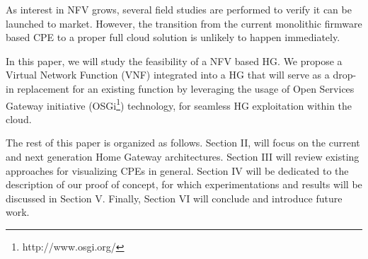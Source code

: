 As interest in NFV grows, several field studies are performed to verify it can be launched to market.
However, the transition from the current monolithic firmware based CPE to a proper full cloud solution is unlikely to happen immediately.

In this paper, we will study the feasibility of a NFV based HG. We propose a Virtual Network Function (VNF) integrated into a HG that will serve as a drop-in replacement for an existing function by leveraging the usage of Open Services Gateway initiative (OSGi\footnote{http://www.osgi.org/}) technology, for seamless HG exploitation within the cloud.

The rest of this paper is organized as follows.
Section II, will focus on the current and next generation Home Gateway architectures.
Section III will review existing approaches for visualizing CPEs in general.
Section IV will be dedicated to the description of our proof of concept, for which experimentations and results will be discussed in Section V.
Finally, Section VI will conclude and introduce future work.

